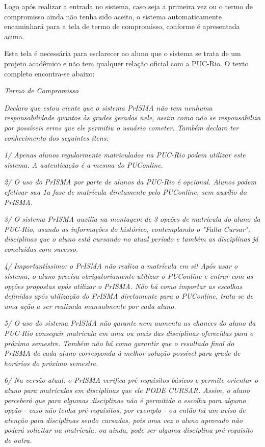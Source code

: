 \documentclass[graduacao,brazil]{ThesisPUC}
\begin{document}
Logo após realizar a entrada no sistema, caso seja a primeira vez ou o termo de compromisso ainda não tenha sido aceito, o sistema automaticamente encaminhará para a tela de termo de compromisso, conforme é apresentada acima. 

Esta tela é necessária para esclarecer ao aluno que o sistema se trata de um projeto acadêmico e não tem qualquer relação oficial com a PUC-Rio. O texto completo encontra-se abaixo:

\vspace{3 mm}

\textit{Termo de Compromisso}

\textit{Declaro que estou ciente que o sistema PrISMA não tem nenhuma responsabilidade quantos às grades geradas nele, assim como não se responsabiliza por possíveis erros que ele permitiu o usuário cometer. Também declaro ter conhecimento dos seguintes ítens:}

\textit{1/ Apenas alunos regularmente matriculados na PUC-Rio podem utilizar este sistema. A autenticação é a mesma do PUConline.} 

\textit{2/ O uso do PrISMA por parte de alunos da PUC-Rio é opcional. Alunos podem efetivar sua 1a fase de matrícula diretamente pelo PUConline, sem auxílio do PrISMA.}

\textit{3/ O sistema PrISMA auxilia na montagem de 3 opções de matrícula do aluno da PUC-Rio, usando as informações do histórico, contemplando o "Falta Cursar", disciplinas que o aluno está cursando no atual período e também as disciplinas já concluídas com sucesso.}

\textit{4/ Importantíssimo: o PrISMA não realiza a matrícula em si! Após usar o sistema, o aluno precisa obrigatoriamente utilizar o PUConline e entrar com as opções propostas após utilizar o PrISMA. Não há como importar as escolhas definidas após utilização do PrISMA diretamente para o PUConline, trata-se de uma ação a ser realizada manualmente por cada aluno.}

\textit{5/ O uso do sistema PrISMA não garante nem aumenta as chances do aluno da PUC-Rio conseguir matrícula em uma ou mais das disciplinas oferecidas para o próximo semestre. Também não há como garantir que o resultado final do PrISMA de cada aluno corresponda à melhor solução possível para grade de horários do próximo semestre.}

\textit{6/ Na versão atual, o PrISMA verifica pré-requisitos básicos e permite orientar o aluno para matrículas em disciplinas que ele PODE CURSAR. Assim, o aluno perceberá que para algumas disciplinas não é permitida a escolha para alguma opção - caso não tenha pré-requisitos, por exemplo - ou então há um aviso de atenção para disciplinas sendo cursadas, pois uma vez o aluno aprovado não poderá solicitar na matrícula, ou ainda, pode ser alguma disciplina pré-requisito de outra.}
\end{document}
